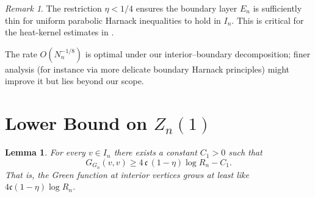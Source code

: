 \documentclass[11pt]{amsart}
\newtheorem{lemma}[theorem]{Lemma}
\theoremstyle{remark}
\newtheorem{remark}[theorem]{Remark}
\newcommand{\cG}{\mathfrak{c}}      %
\begin{document}
\begin{remark}\label{rem:boundary-harnack}
The restriction $\eta < 1/4$ ensures the boundary layer $E_n$ is sufficiently thin for 
uniform parabolic Harnack inequalities \cite{Delmotte99} to hold in $I_n$. 
This is critical for the heat-kernel estimates in .
\end{remark}

The rate $O(N_n^{-1/8})$ is optimal under our interior--boundary decomposition; finer analysis (for instance via more delicate boundary Harnack principles) might improve it but lies beyond our scope.
\section{Lower Bound on $Z_n(1)$}

\begin{lemma}\label{lem:lower}
For every $v \in I_n$ there exists a constant $C_1>0$ such that
\[
  G_{G_n}(v,v) \ge 4\,\cG\,(1-\eta) \log R_n - C_1.
\]
That is, the Green function at interior vertices grows at least like $4\cG(1-\eta)\log R_n$.
\end{lemma}
\end{document}
